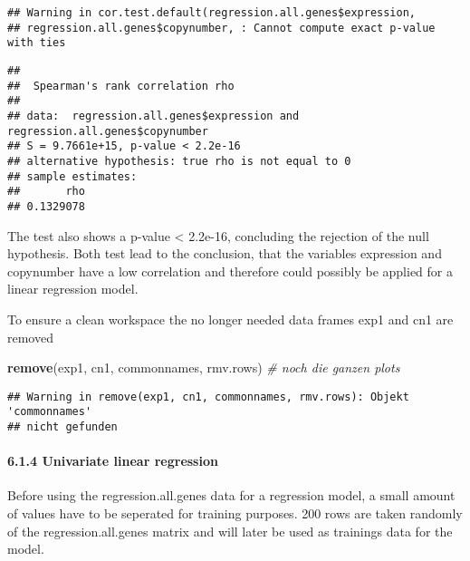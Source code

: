 \documentclass[]{article}
\newenvironment{Shaded}{\begin{snugshade}}{\end{snugshade}}
\newcommand{\CommentTok}[1]{\textcolor[rgb]{0.56,0.35,0.01}{\textit{#1}}}
\newcommand{\DataTypeTok}[1]{\textcolor[rgb]{0.13,0.29,0.53}{#1}}
\newcommand{\KeywordTok}[1]{\textcolor[rgb]{0.13,0.29,0.53}{\textbf{#1}}}
\newcommand{\NormalTok}[1]{#1}
\newcommand{\OperatorTok}[1]{\textcolor[rgb]{0.81,0.36,0.00}{\textbf{#1}}}
\newcommand{\StringTok}[1]{\textcolor[rgb]{0.31,0.60,0.02}{#1}}
\let\oldparagraph\paragraph
\renewcommand{\paragraph}[1]{\oldparagraph{#1}\mbox{}}
\begin{document}
\begin{Shaded}
\end{Shaded}

\begin{verbatim}
## Warning in cor.test.default(regression.all.genes$expression,
## regression.all.genes$copynumber, : Cannot compute exact p-value with ties
\end{verbatim}

\begin{verbatim}
## 
##  Spearman's rank correlation rho
## 
## data:  regression.all.genes$expression and regression.all.genes$copynumber
## S = 9.7661e+15, p-value < 2.2e-16
## alternative hypothesis: true rho is not equal to 0
## sample estimates:
##       rho 
## 0.1329078
\end{verbatim}

The test also shows a p-value \textless{} 2.2e-16, concluding the
rejection of the null hypothesis. Both test lead to the conclusion, that
the variables expression and copynumber have a low correlation and
therefore could possibly be applied for a linear regression model.

To ensure a clean workspace the no longer needed data frames exp1 and
cn1 are removed

\begin{Shaded}
\begin{Highlighting}[]
\KeywordTok{remove}\NormalTok{(exp1, cn1, commonnames, rmv.rows) }\CommentTok{# noch die ganzen plots}
\end{Highlighting}
\end{Shaded}

\begin{verbatim}
## Warning in remove(exp1, cn1, commonnames, rmv.rows): Objekt 'commonnames'
## nicht gefunden
\end{verbatim}

\hypertarget{univariate-linear-regression}{%
\paragraph{6.1.4 Univariate linear
regression}\label{univariate-linear-regression}}

Before using the regression.all.genes data for a regression model, a
small amount of values have to be seperated for training purposes. 200
rows are taken randomly of the regression.all.genes matrix and will
later be used as trainings data for the model.
\end{document}

